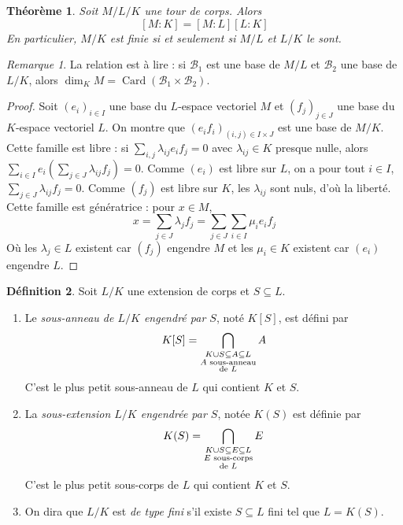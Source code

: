 \documentclass{article}
\newcommand{\base}{\mathcal{B}}
\DeclareMathOperator{\Card}{Card}
\theoremstyle{plain}
\newtheorem{theorem}{Théorème}[subsection]
\theoremstyle{definition}
\newtheorem{definition}[theorem]{Définition}
\theoremstyle{remark}
\newtheorem*{remark}{Remarque}
\begin{document}
\begin{theorem} \label{thmdeg}
    Soit $M/L/K$ une tour de corps. Alors
    \[[M : K] = [M : L] [L : K]\]
    En particulier, $M/K$ est finie si et seulement si $M/L$ et $L/K$ le sont.
\end{theorem}

\begin{remark}
    La relation est à lire : si $\base_1$ est une base de $M/L$ et $\base_2$ une base de $L/K$, alors $\dim_K M = \Card(\base_1 \times \base_2)$.
\end{remark}

\begin{proof}
    Soit $(e_i)_{i\in I}$ une base du $L$-espace vectoriel $M$ et $(f_j)_{j \in J}$ une base du $K$-espace vectoriel $L$. On montre que $(e_i f_i)_{(i,j) \in I \times J}$ est une base de $M/K$. \\
    Cette famille est libre : si $\sum\limits_{i,j} \lambda_{ij} e_i f_j = 0$ avec $\lambda_{ij} \in K$ presque nulle, alors $\sum\limits_{i \in I} e_i \left(\sum\limits_{j \in J} \lambda_{ij} f_j\right) = 0$. Comme $(e_i)$ est libre sur $L$, on a pour tout $i \in I$, $\sum\limits_{j \in J} \lambda_{ij} f_j = 0$. Comme $(f_j)$ est libre sur $K$, les $\lambda_{ij}$ sont nuls, d'où la liberté. Cette famille est génératrice : pour $x \in M$,
    \[x = \sum_{j\in J} \lambda_j f_j = \sum_{j \in J} \sum_{i \in I} \mu_i e_i f_j\]
    Où les $\lambda_j \in L$ existent car $(f_j)$ engendre $M$ et les $\mu_i \in K$ existent car $(e_i)$ engendre $L$.
\end{proof}

\begin{definition}
    Soit $L/K$ une extension de corps et $S \subseteq L$.
    \begin{enumerate}
        \item Le \emph{sous-anneau de $L/K$ engendré par $S$}, noté $K[S]$, est défini par
        \[K[S] = \bigcap\limits_{\begin{subarray}{c} K \cup S \subseteq A \subseteq L \\ A \text{ sous-anneau} \\ \text{de } L\end{subarray}} A\]
        C'est le plus petit sous-anneau de $L$ qui contient $K$ et $S$.
        \item La \emph{sous-extension $L/K$ engendrée par $S$}, notée $K(S)$ est définie par
        \[K(S) = \bigcap\limits_{\begin{subarray}{c} K \cup S \subseteq E \subseteq L \\ E \text{ sous-corps} \\ \text{de } L\end{subarray}} E\]
        C'est le plus petit sous-corps de $L$ qui contient $K$ et $S$.
        \item On dira que $L/K$ est \emph{de type fini} s'il existe $S \subseteq L$ fini tel que $L = K(S)$.
    \end{enumerate}
\end{definition}
\end{document}
